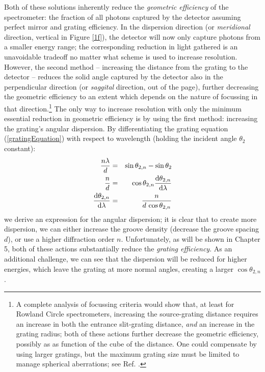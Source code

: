 Both of these solutions inherently reduce the \emph{geometric efficiency} of the spectrometer: the fraction of all photons captured by the detector assuming perfect mirror and grating efficiency.  In the dispersion direction (or \emph{meridional} direction, vertical in Figure \ref{1f}), the detector will now only capture photons from a smaller energy range; the corresponding reduction in light gathered is an unavoidable tradeoff no matter what scheme is used to increase  resolution.  However, the second method -- increasing the distance from the grating to the detector --  reduces the solid angle captured by the detector also in the perpendicular direction (or \emph{saggital} direction, out of the page), further decreasing the geometric efficiency to an extent which depends on the nature of focussing in that direction.\footnote{A complete analysis of focussing criteria would show that, at least for Rowland Circle spectrometers, increasing the source-grating distance requires an increase in both the entrance slit-grating distance, \emph{and} an increase in the grating radius; both of these actions further decrease the geometric efficiency, possibly as as function of the cube of the distance.  One could compensate by using larger gratings, but the maximum grating size must be limited to manage spherical aberrations; see Ref. \cite[p.~98]{Mui06}.}  The only way to increase resolution with only the minimum essential reduction in geometric efficiency is by using the first method: increasing the grating's angular dispersion.  By differentiating the grating equation (\ref{gratingEquation}) with respect to wavelength (holding the incident angle $\theta_{2}$ constant):
\begin{eqnarray}
\frac{n\lambda}{d} &=& \sin\theta_{2,n} - \sin\theta_{2} \\
\frac{n}{d} &=& \cos \theta_{2,n} \frac{\mathrm{d} \theta_{2,n}}{\mathrm{d} \lambda} \\
\frac{\mathrm{d} \theta_{2,n}}{\mathrm{d} \lambda} &=& \frac{n}{d\, \cos \theta_{2,n}}
\label{angularDispersionEqn}
\end{eqnarray}
we derive an expression for the angular dispersion; it is clear that to create more dispersion, we can either increase the groove density (decrease the groove spacing $d$), or use a higher diffraction order $n$.  Unfortunately, as will be shown in Chapter 5, both of these actions substantially reduce the \emph{grating efficiency}.  As an additional challenge, we can see that the dispersion will be reduced for higher energies, which leave the grating at more normal angles, creating a larger $\cos \theta_{2,n}$.


